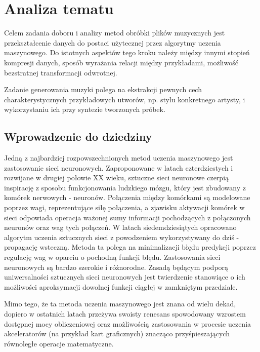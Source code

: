 \chapter{Analiza tematu}
{
  Celem zadania doboru i analizy metod obróbki plików muzycznych jest 
  przekształcenie danych do postaci użytecznej przez algorytmy uczenia maszynowego.
  Do istotnych aspektów tego kroku należy między innymi stopień kompresji danych,
  sposób wyrażania relacji między przykładami, możliwość bezstratnej transformacji odwrotnej. 

  Zadanie generowania muzyki polega na ekstrakcji pewnych cech charakterystycznych
  przykładowych utworów, np. stylu konkretnego artysty, 
  i wykorzystaniu ich przy syntezie tworzonych próbek. 

  \section{Wprowadzenie do dziedziny}
  {
    Jedną z najbardziej rozpowszechnionych metod uczenia maszynowego jest zastosowanie sieci neuronowych.
    Zaproponowane w latach czterdziestych i rozwijane w drugiej połowie XX wieku, sztuczne sieci neuronowe
    czerpią inspirację z sposobu funkcjonowania ludzkiego mózgu, który jest zbudowany z komórek nerwowych - neuronów.
    Połączenia między komórkami są modelowane poprzez wagi, reprezentujące siłę połączenia, a zjawisku aktywacji
    komórek w sieci odpowiada operacja ważonej sumy informacji pochodzących z połączonych neuronów oraz wag tych połączeń.
    W latach siedemdziesiątych opracowano algorytm uczenia sztucznych sieci z powodzeniem wykorzystywany
    do dziś - propagację wsteczną. Metoda ta polega na minimalizacji błędu predykcji poprzez regulację
    wag w oparciu o pochodną funkcji błędu.
    Zastosowania sieci neuronowych są bardzo szerokie i różnorodne. Zasadą będącym podporą uniwersalności 
    sztucznych sieci neuronowych jest twierdzenie stanowiące o ich możliwości aproksymacji dowolnej 
    funkcji ciągłej w zamkniętym przedziale.

    Mimo tego, że ta metoda uczenia maszynowego jest znana od wielu dekad, dopiero w ostatnich latach
    przeżywa swoisty renesans spowodowany wzrostem dostępnej mocy obliczeniowej oraz 
    możliwością zastosowania w procesie uczenia akceleratorów (na przykład kart graficznych) znacząco 
    przyśpieszających równoległe operacje matematyczne.


}}
